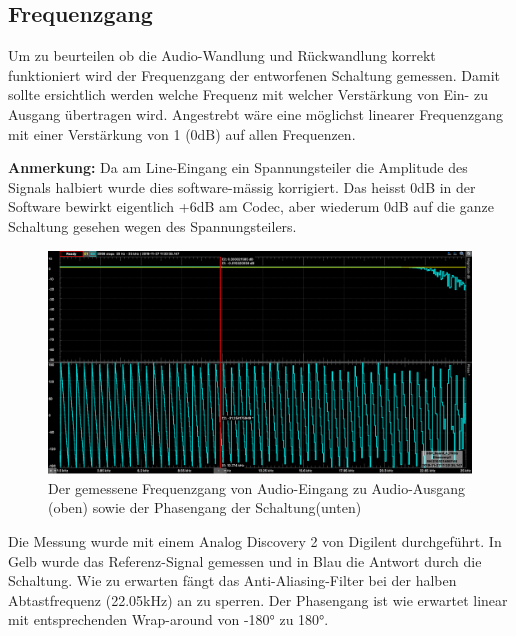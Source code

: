 \subsection{Frequenzgang}
\label{subsec:Frequenzgang}
Um zu beurteilen ob die Audio-Wandlung und Rückwandlung korrekt funktioniert wird der Frequenzgang der entworfenen Schaltung gemessen. Damit sollte ersichtlich werden welche Frequenz mit welcher Verstärkung von Ein- zu Ausgang übertragen wird. Angestrebt wäre eine möglichst linearer Frequenzgang mit einer Verstärkung von 1 (0dB) auf allen Frequenzen.

\textbf{Anmerkung:} Da am Line-Eingang ein Spannungsteiler die Amplitude des Signals halbiert wurde dies software-mässig korrigiert. Das heisst 0dB in der Software bewirkt eigentlich +6dB am Codec, aber wiederum 0dB auf die ganze Schaltung gesehen wegen des Spannungsteilers.

\begin{figure} [H]
\begin{center}
 \includegraphics[scale=0.23]{../graphics/DSP_Board_FREQ.png}
 \caption{Der gemessene Frequenzgang von Audio-Eingang zu Audio-Ausgang (oben) sowie der Phasengang der Schaltung(unten)}
\label{fig:frequenzgang}
\end{center}
\end{figure}
Die Messung wurde mit einem Analog Discovery 2 von Digilent durchgeführt. In Gelb wurde das Referenz-Signal gemessen und in Blau die Antwort durch die Schaltung. Wie zu erwarten fängt das Anti-Aliasing-Filter bei der halben Abtastfrequenz (22.05kHz) an zu sperren. Der Phasengang ist wie erwartet linear mit entsprechenden Wrap-around von -180° zu 180°.